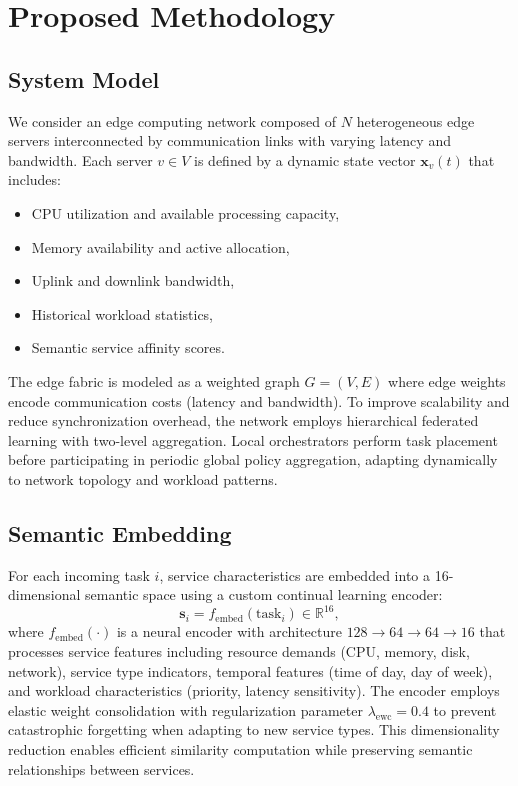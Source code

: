 \section{Proposed Methodology}
\label{sec:methodology}

\subsection{System Model}
We consider an edge computing network composed of $N$ heterogeneous edge servers interconnected by communication links with varying latency and bandwidth. Each server $v \in V$ is defined by a dynamic state vector $\mathbf{x}_v(t)$ that includes:
\begin{itemize}
	\item CPU utilization and available processing capacity,
	\item Memory availability and active allocation,
	\item Uplink and downlink bandwidth,
	\item Historical workload statistics,
	\item Semantic service affinity scores.
\end{itemize}

The edge fabric is modeled as a weighted graph $G = (V, E)$ where edge weights encode communication costs (latency and bandwidth). To improve scalability and reduce synchronization overhead, the network employs hierarchical federated learning with two-level aggregation. Local orchestrators perform task placement before participating in periodic global policy aggregation, adapting dynamically to network topology and workload patterns.

\subsection{Semantic Embedding}
For each incoming task $i$, service characteristics are embedded into a 16-dimensional semantic space using a custom continual learning encoder:
\begin{equation}
	\mathbf{s}_i = f_{\text{embed}}(\text{task}_i) \in \mathbb{R}^{16},
\end{equation}
where $f_{\text{embed}}(\cdot)$ is a neural encoder with architecture $128 \rightarrow 64 \rightarrow 64 \rightarrow 16$ that processes service features including resource demands (CPU, memory, disk, network), service type indicators, temporal features (time of day, day of week), and workload characteristics (priority, latency sensitivity). The encoder employs elastic weight consolidation with regularization parameter $\lambda_{\text{ewc}} = 0.4$ to prevent catastrophic forgetting when adapting to new service types. This dimensionality reduction enables efficient similarity computation while preserving semantic relationships between services.

